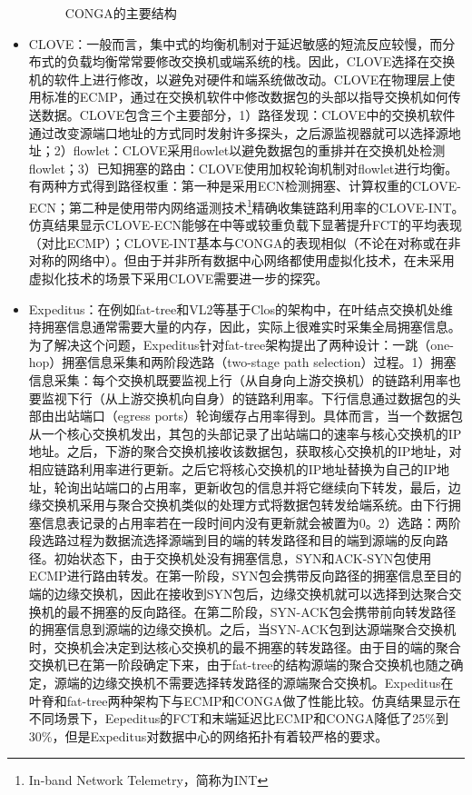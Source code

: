 \begin{itemize}
\begin{figure}[htb!]
\begin{subfigure}{0.45\textwidth}
\end{subfigure}%
\caption{CONGA的主要结构}
\end{figure}
    \item CLOVE\cite{katta2016CLOVE}：一般而言，集中式的均衡机制对于延迟敏感的短流反应较慢，而分布式的负载均衡常常要修改交换机或端系统的栈。因此，CLOVE选择在交换机的软件上进行修改，以避免对硬件和端系统做改动。CLOVE在物理层上使用标准的ECMP，通过在交换机软件中修改数据包的头部以指导交换机如何传送数据。CLOVE包含三个主要部分，1）路径发现：CLOVE中的交换机软件通过改变源端口地址的方式同时发射许多探头，之后源监视器就可以选择源地址；2）flowlet：CLOVE采用flowlet以避免数据包的重排并在交换机处检测flowlet；3）已知拥塞的路由：CLOVE使用加权轮询机制对flowlet进行均衡。有两种方式得到路径权重：第一种是采用ECN检测拥塞、计算权重的CLOVE-ECN；第二种是使用带内网络遥测技术\footnote{In-band Network Telemetry，简称为INT}精确收集链路利用率的CLOVE-INT。仿真结果显示CLOVE-ECN能够在中等或较重负载下显著提升FCT的平均表现（对比ECMP）；CLOVE-INT基本与CONGA的表现相似（不论在对称或在非对称的网络中）。但由于并非所有数据中心网络都使用虚拟化技术，在未采用虚拟化技术的场景下采用CLOVE需要进一步的探究。
    \item Expeditus\cite{wang2014Expeditus}：在例如fat-tree\cite{alfares2008fattree}和VL2\cite{greenberg2009vl2}等基于Clos的架构中，在叶结点交换机处维持拥塞信息通常需要大量的内存，因此，实际上很难实时采集全局拥塞信息。为了解决这个问题，Expeditus针对fat-tree架构提出了两种设计：一跳（one-hop）拥塞信息采集和两阶段选路（two-stage path selection）过程。1）拥塞信息采集：每个交换机既要监视上行（从自身向上游交换机）的链路利用率也要监视下行（从上游交换机向自身）的链路利用率。下行信息通过数据包的头部由出站端口（egress ports）轮询缓存占用率得到。具体而言，当一个数据包从一个核心交换机发出，其包的头部记录了出站端口的速率与核心交换机的IP地址。之后，下游的聚合交换机接收该数据包，获取核心交换机的IP地址，对相应链路利用率进行更新。之后它将核心交换机的IP地址替换为自己的IP地址，轮询出站端口的占用率，更新收包的信息并将它继续向下转发，最后，边缘交换机采用与聚合交换机类似的处理方式将数据包转发给端系统。由下行拥塞信息表记录的占用率若在一段时间内没有更新就会被置为0。2）选路：两阶段选路过程为数据流选择源端到目的端的转发路径和目的端到源端的反向路径。初始状态下，由于交换机处没有拥塞信息，SYN和ACK-SYN包使用ECMP进行路由转发。在第一阶段，SYN包会携带反向路径的拥塞信息至目的端的边缘交换机，因此在接收到SYN包后，边缘交换机就可以选择到达聚合交换机的最不拥塞的反向路径。在第二阶段，SYN-ACK包会携带前向转发路径的拥塞信息到源端的边缘交换机。之后，当SYN-ACK包到达源端聚合交换机时，交换机会决定到达核心交换机的最不拥塞的转发路径。由于目的端的聚合交换机已在第一阶段确定下来，由于fat-tree的结构源端的聚合交换机也随之确定，源端的边缘交换机不需要选择转发路径的源端聚合交换机。Expeditus在叶脊和fat-tree两种架构下与ECMP和CONGA做了性能比较。仿真结果显示在不同场景下，Eepeditus的FCT和末端延迟比ECMP和CONGA降低了25\%到30\%，但是Expeditus对数据中心的网络拓扑有着较严格的要求。

\end{itemize}
